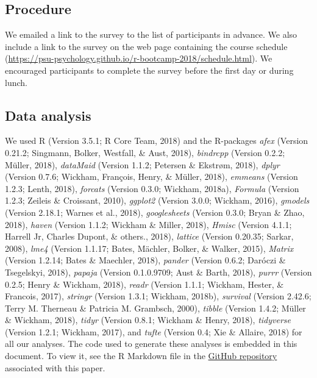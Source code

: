 \documentclass[english,man]{apa6}
\theoremstyle{definition}
\theoremstyle{definition}
\theoremstyle{definition}
\theoremstyle{remark}
\begin{document}
\subsection{Procedure}\label{procedure}

We emailed a link to the survey to the list of participants in advance.
We also include a link to the survey on the web page containing the
course schedule
(\url{https://psu-psychology.github.io/r-bootcamp-2018/schedule.html}).
We encouraged participants to complete the survey before the first day
or during lunch.

\subsection{Data analysis}\label{data-analysis}

We used R (Version 3.5.1; R Core Team, 2018) and the R-packages
\emph{afex} (Version 0.21.2; Singmann, Bolker, Westfall, \& Aust, 2018),
\emph{bindrcpp} (Version 0.2.2; Müller, 2018), \emph{dataMaid} (Version
1.1.2; Petersen \& Ekstrøm, 2018), \emph{dplyr} (Version 0.7.6; Wickham,
François, Henry, \& Müller, 2018), \emph{emmeans} (Version 1.2.3; Lenth,
2018), \emph{forcats} (Version 0.3.0; Wickham, 2018a), \emph{Formula}
(Version 1.2.3; Zeileis \& Croissant, 2010), \emph{ggplot2} (Version
3.0.0; Wickham, 2016), \emph{gmodels} (Version 2.18.1; Warnes et al.,
2018), \emph{googlesheets} (Version 0.3.0; Bryan \& Zhao, 2018),
\emph{haven} (Version 1.1.2; Wickham \& Miller, 2018), \emph{Hmisc}
(Version 4.1.1; Harrell Jr, Charles Dupont, \& others., 2018),
\emph{lattice} (Version 0.20.35; Sarkar, 2008), \emph{lme4} (Version
1.1.17; Bates, Mächler, Bolker, \& Walker, 2015), \emph{Matrix} (Version
1.2.14; Bates \& Maechler, 2018), \emph{pander} (Version 0.6.2; Daróczi
\& Tsegelskyi, 2018), \emph{papaja} (Version 0.1.0.9709; Aust \& Barth,
2018), \emph{purrr} (Version 0.2.5; Henry \& Wickham, 2018),
\emph{readr} (Version 1.1.1; Wickham, Hester, \& Francois, 2017),
\emph{stringr} (Version 1.3.1; Wickham, 2018b), \emph{survival} (Version
2.42.6; Terry M. Therneau \& Patricia M. Grambsch, 2000), \emph{tibble}
(Version 1.4.2; Müller \& Wickham, 2018), \emph{tidyr} (Version 0.8.1;
Wickham \& Henry, 2018), \emph{tidyverse} (Version 1.2.1; Wickham,
2017), and \emph{tufte} (Version 0.4; Xie \& Allaire, 2018) for all our
analyses. The code used to generate these analyses is embedded in this
document. To view it, see the R Markdown file in the
\href{http://github.com/psu-psychology/r-bootcamp-2018/talks}{GitHub
repository} associated with this paper.
\end{document}
